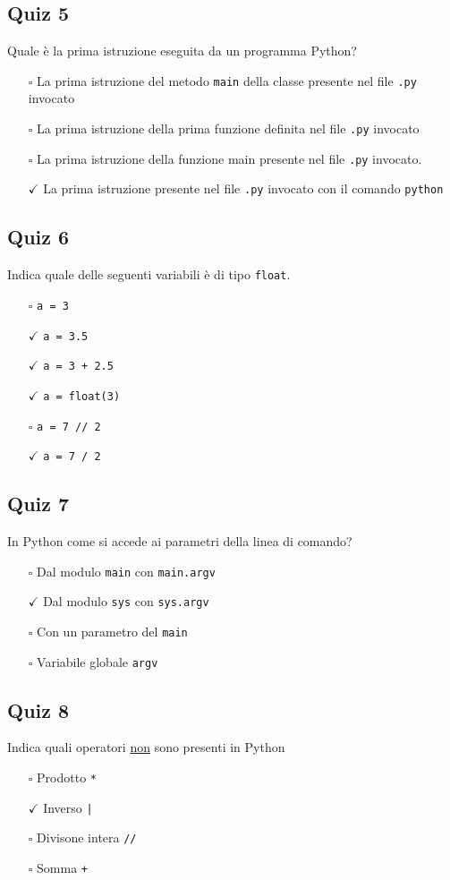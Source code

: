\documentclass{article}
\begin{document}
\subsection*{Quiz 5}
Quale è la prima istruzione eseguita da un programma Python?
\begin{itemize}
  \item[$\square$] La prima istruzione del metodo \texttt{main} della classe presente nel file \texttt{.py} invocato
  \item[$\square$] La prima istruzione della prima funzione definita nel file \texttt{.py} invocato
  \item[$\square$] La prima istruzione della funzione main presente nel file \texttt{.py} invocato.
  \item[$\checkmark$] La prima istruzione presente nel file \texttt{.py} invocato con il comando \texttt{python}
\end{itemize}
\subsection*{Quiz 6}
Indica quale delle seguenti variabili è di tipo \texttt{float}.
\begin{itemize}
  \item[$\square$] \texttt{a = 3}
  \item[$\checkmark$] \texttt{a = 3.5}
  \item[$\checkmark$] \texttt{a = 3 + 2.5}
  \item[$\checkmark$] \texttt{a = float(3)}
  \item[$\square$] \texttt{a = 7 // 2}
  \item[$\checkmark$] \texttt{a = 7 / 2}
\end{itemize}
\subsection*{Quiz 7}
In Python come si accede ai parametri della linea di comando?
\begin{itemize}
  \item[$\square$] Dal modulo \texttt{main} con \texttt{main.argv}
  \item[$\checkmark$] Dal modulo \texttt{sys} con \texttt{sys.argv}
  \item[$\square$] Con un parametro del \texttt{main}
  \item[$\square$] Variabile globale \texttt{argv}
\end{itemize}
\subsection*{Quiz 8}
Indica quali operatori \underline{non} sono presenti in Python
\begin{itemize}
  \item[$\square$] Prodotto \texttt{*}
  \item[$\checkmark$] Inverso \texttt{|}
  \item[$\square$] Divisone intera \texttt{//}
  \item[$\square$] Somma \texttt{+}
\end{itemize}
\end{document}
